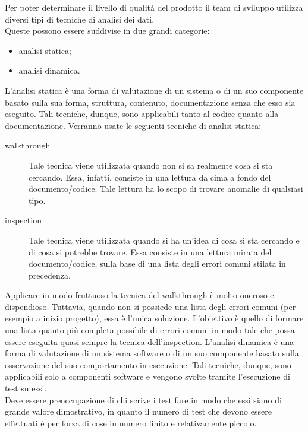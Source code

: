 			Per poter determinare il livello di qualità del prodotto il team di sviluppo utilizza diversi tipi di tecniche di analisi dei dati.\\
			Queste possono essere suddivise in due grandi categorie:
			\begin{itemize}
				\item analisi statica;
				\item analisi dinamica.
			\end{itemize}
				L'analisi statica è una forma di valutazione di un sistema o di un suo componente basato sulla sua forma, struttura, contenuto, documentazione senza che esso sia eseguito. Tali tecniche, dunque, sono applicabili tanto al codice quanto alla documentazione.
				Verranno usate le seguenti tecniche di analisi statica:
				\begin{description}
					\item[walkthrough] Tale tecnica viene utilizzata quando non si sa realmente cosa si sta cercando. Essa, infatti, consiste in una lettura da cima a fondo del documento/codice. Tale lettura ha lo scopo di trovare anomalie di qualsiasi tipo.
					\item[inspection] Tale tecnica viene utilizzata quando si ha un'idea di cosa si sta cercando e di cosa si potrebbe trovare. Essa consiste in una lettura mirata del documento/codice, sulla base di una lista degli errori comuni stilata in precedenza.
				\end{description}
				Applicare in modo fruttuoso la tecnica del walkthrough è molto oneroso e dispendioso. Tuttavia, quando non si possiede una lista degli	errori comuni (per esempio a inizio progetto), essa è l'unica soluzione. L'obiettivo è quello di formare una lista quanto più completa possibile di errori comuni in modo tale che possa essere eseguita quasi sempre la tecnica dell'inspection.
				L'analisi dinamica è una forma di valutazione di un sistema software o di un suo componente basato sulla osservazione del suo comportamento in esecuzione. Tali tecniche, dunque, sono applicabili solo a componenti software e vengono svolte tramite l'esecuzione di test su essi.\\
				Deve essere preoccupazione di chi scrive i test fare in modo che essi siano di grande valore dimostrativo, in quanto il numero di test che devono essere effettuati è per forza di cose in numero finito e relativamente piccolo.
		
